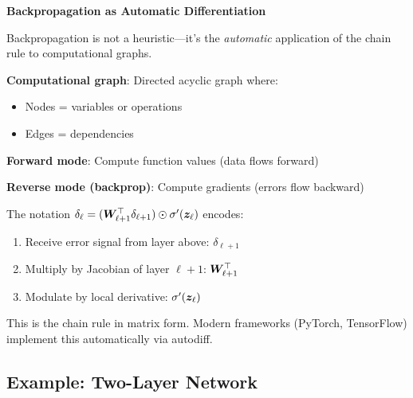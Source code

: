 \begin{philobox}
\textbf{Backpropagation as Automatic Differentiation}

Backpropagation is not a heuristic---it's the \textit{automatic} application of the chain rule to computational graphs.

\textbf{Computational graph}: Directed acyclic graph where:
\begin{itemize}
    \item Nodes = variables or operations
    \item Edges = dependencies
\end{itemize}

\textbf{Forward mode}: Compute function values (data flows forward)

\textbf{Reverse mode (backprop)}: Compute gradients (errors flow backward)

The notation $\delta_\ell = (\bm{W}_{\ell+1}^\top \delta_{\ell+1}) \odot \sigma'(\bm{z}_\ell)$ encodes:
\begin{enumerate}
    \item Receive error signal from layer above: $\delta_{\ell+1}$
    \item Multiply by Jacobian of layer $\ell+1$: $\bm{W}_{\ell+1}^\top$
    \item Modulate by local derivative: $\sigma'(\bm{z}_\ell)$
\end{enumerate}

This is the chain rule in matrix form. Modern frameworks (PyTorch, TensorFlow) implement this automatically via autodiff.
\end{philobox}

\subsection{Example: Two-Layer Network}

